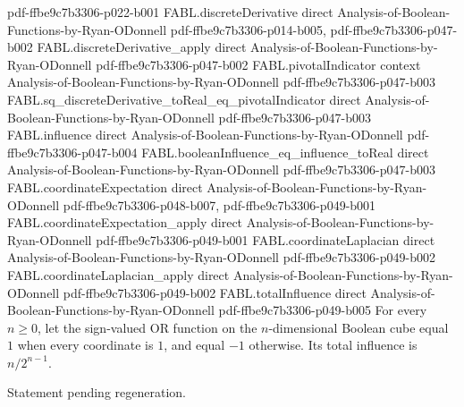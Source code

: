\begin{theorem}
  {pdf-ffbe9c7b3306-p022-b001}
\proofstep
  {FABL.discreteDerivative}
  {direct}
  {Analysis-of-Boolean-Functions-by-Ryan-ODonnell}
  {pdf-ffbe9c7b3306-p014-b005,
    pdf-ffbe9c7b3306-p047-b002}
\proofstep
  {FABL.discreteDerivative_apply}
  {direct}
  {Analysis-of-Boolean-Functions-by-Ryan-ODonnell}
  {pdf-ffbe9c7b3306-p047-b002}
\proofstep
  {FABL.pivotalIndicator}
  {context}
  {Analysis-of-Boolean-Functions-by-Ryan-ODonnell}
  {pdf-ffbe9c7b3306-p047-b003}
\proofstep
  {FABL.sq_discreteDerivative_toReal_eq_pivotalIndicator}
  {direct}
  {Analysis-of-Boolean-Functions-by-Ryan-ODonnell}
  {pdf-ffbe9c7b3306-p047-b003}
\proofstep
  {FABL.influence}
  {direct}
  {Analysis-of-Boolean-Functions-by-Ryan-ODonnell}
  {pdf-ffbe9c7b3306-p047-b004}
\proofstep
  {FABL.booleanInfluence_eq_influence_toReal}
  {direct}
  {Analysis-of-Boolean-Functions-by-Ryan-ODonnell}
  {pdf-ffbe9c7b3306-p047-b003}
\proofstep
  {FABL.coordinateExpectation}
  {direct}
  {Analysis-of-Boolean-Functions-by-Ryan-ODonnell}
  {pdf-ffbe9c7b3306-p048-b007,
    pdf-ffbe9c7b3306-p049-b001}
\proofstep
  {FABL.coordinateExpectation_apply}
  {direct}
  {Analysis-of-Boolean-Functions-by-Ryan-ODonnell}
  {pdf-ffbe9c7b3306-p049-b001}
\proofstep
  {FABL.coordinateLaplacian}
  {direct}
  {Analysis-of-Boolean-Functions-by-Ryan-ODonnell}
  {pdf-ffbe9c7b3306-p049-b002}
\proofstep
  {FABL.coordinateLaplacian_apply}
  {direct}
  {Analysis-of-Boolean-Functions-by-Ryan-ODonnell}
  {pdf-ffbe9c7b3306-p049-b002}
\proofstep
  {FABL.totalInfluence}
  {direct}
  {Analysis-of-Boolean-Functions-by-Ryan-ODonnell}
  {pdf-ffbe9c7b3306-p049-b005}
For every $n\ge 0$, let the sign-valued OR function on the $n$-dimensional Boolean cube
equal $1$ when every coordinate is $1$, and equal $-1$ otherwise. Its total influence is
$n/2^{n-1}$.
\end{theorem}

\begin{theorem}
\label{FABL.totalInfluence_andFunction}
\leanok
{}
Statement pending regeneration.
\end{theorem}


